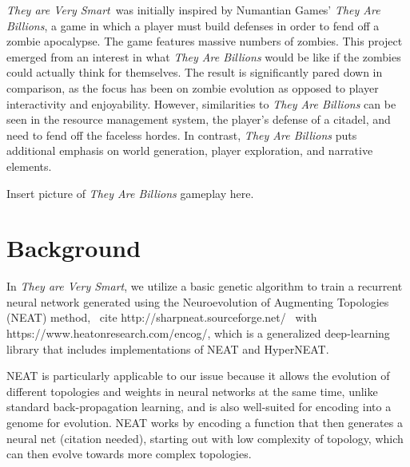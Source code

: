 \documentclass[letterpaper]{article}
\def\tavs{\textit{They are Very Smart}}
\begin{document}

\tavs~was initially inspired by Numantian Games' \textit{They Are Billions}, a game in which a player must build defenses in order to fend off a zombie apocalypse. The game features massive numbers of zombies. This project emerged from an interest in what \textit{They Are Billions} would be like if the zombies could actually think for themselves. The result is significantly pared down in comparison, as the focus has been on zombie evolution as opposed to player interactivity and enjoyability. However, similarities to \textit{They Are Billions} can be seen in the resource management system, the player's defense of a citadel, and need to fend off the faceless hordes. In contrast, \textit{They Are Billions} puts additional emphasis on world generation, player exploration, and narrative elements.

Insert picture of \textit{They Are Billions} gameplay here.

\section{Background}
In \tavs, we utilize a basic genetic algorithm to train a recurrent neural network generated using the Neuroevolution of Augmenting Topologies (NEAT) method, ~cite http://sharpneat.sourceforge.net/~ with https://www.heatonresearch.com/encog/, which is a generalized deep-learning library that includes implementations of NEAT and HyperNEAT.

NEAT is particularly applicable to our issue because it allows the evolution of different topologies and weights in neural networks at the same time, unlike standard back-propagation learning, and is also well-suited for encoding into a genome for evolution. NEAT works by encoding a function that then generates a neural net (citation needed), starting out with low complexity of topology, which can then evolve towards more complex topologies.
\end{document}
